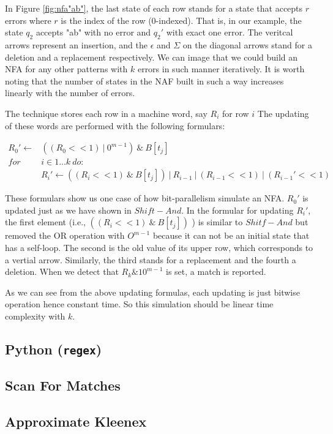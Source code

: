 In Figure \ref{fig:nfa"ab"}, the last state of each row stands for a state that accepts $r$ errors where $r$ is the index of the row (0-indexed). That is, in our example, the state $q_2$ accepts "ab" with no error and $q_2'$  with exact one error. The veritcal arrows represent an insertion, and the $\epsilon$ and $\Sigma$ on the diagonal arrows stand for a deletion and a replacement respectively. We can image that we could build an NFA for any other patterns with $k$ errors in such manner iteratively. It is worth noting that the number of states in the NAF built in such a way increases linearly with the number of errors.

The technique stores each row in a machine word, say $R_i$ for row $i$ %
The updating of these words are performed with the following formulars: 

\begin{align*}
R_0' \leftarrow & ((R_0 << 1) \ |\ 0^{m-1}) \ \& \ B[t_j] \\
for \ &i \in 1...k \ do:  \\
	& R_i' \leftarrow ((R_i << 1) \ \& \ B[t_j] ) \ |\ R_{i-1} \ | \ (R_{i-1} << 1 ) \ |\ (R_{i-1}' << 1)
\end{align*}

These formulars show us one case of how bit-parallelism simulate an NFA. $R_0'$ is updated just as we have shown in $Shift-And$. In the formular for updating $R_i'$, the first element (i.e., $((R_i << 1) \ \& \ B[t_j] ) $ ) is similar to $Shitf-And$ but removed the OR operation with $O^{m-1}$ because it can not be an initial state that has a self-loop. The second is the old value of its upper row, which corresponds to a vertial arrow. Similarly, the third stands for a replacement and the fourth a deletion. When we detect that $R_k \& 10^{m-1}$ is set, a match is reported.  

As we can see from the above updating formulas, each updating is just bitwise operation hence constant time. So this simulation should be linear time complexity with $k$.
 
\subsection{Python (\texttt{regex})}

\subsection{Scan For Matches}


\subsection{Approximate Kleenex}